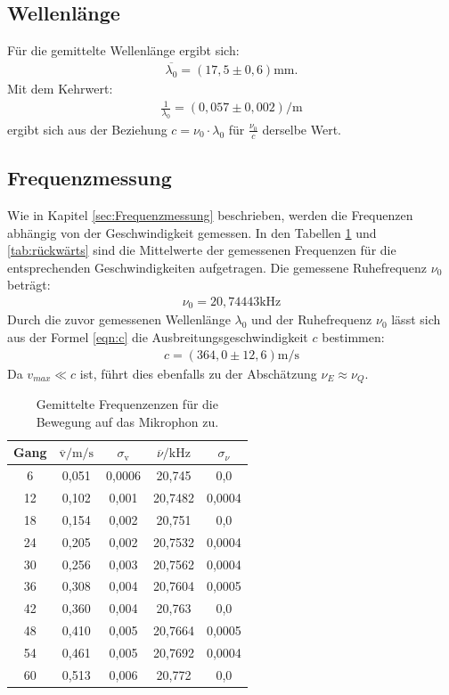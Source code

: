\subsection{Wellenlänge }
Für die gemittelte Wellenlänge ergibt sich:
\begin{align}
  \overline{\lambda_0}=(17,5\pm 0,6) \si{\milli\meter}.
\end{align}
Mit dem Kehrwert:
\begin{align}
\frac{1}{\lambda_0}=(0,057\pm 0,002) \si{\per\meter}
\end{align}
ergibt sich aus der Beziehung $c=\nu_0\cdot\lambda_0$ für $\frac{\nu_0}{c}$
derselbe Wert.

\subsection{Frequenzmessung}
Wie in Kapitel \ref{sec:Frequenzmessung} beschrieben, werden die
Frequenzen abhängig von der Geschwindigkeit gemessen.
In den Tabellen \ref{tab:vorwärts} und \ref{tab:rückwärts} sind
die Mittelwerte der gemessenen Frequenzen
für die entsprechenden Geschwindigkeiten aufgetragen.
Die gemessene Ruhefrequenz $\nu_0$ beträgt:
\begin{align}
  \nu_0=20,74443\text{kHz}
\end{align}
Durch die zuvor gemessenen Wellenlänge $\lambda_0$
und der Ruhefrequenz $\nu_0$ lässt sich aus der Formel \eqref{eqn:c}
die Ausbreitungsgeschwindigkeit $c$ bestimmen:
\begin{align}
  c=(364,0\pm12,6)\si{\meter\per\second}
\end{align}
Da $v_{max}\ll c$ ist, führt dies ebenfalls zu der Abschätzung
$\nu_E \approx \nu_Q $.
\begin{table}
  \centering
  \caption{Gemittelte Frequenzenzen für die Bewegung auf das Mikrophon zu.}
  \label{tab:vorwärts}
  \begin{tabular}{c c c c c}
    \toprule
Gang &  $ \overline{\text{v}} / \si{\meter\per\second}$ & $\sigma_{\text{v}}$
 & $\overline{\nu}/\si{\kilo\hertz}$ & $\sigma_{\nu}$\\
    \midrule
    6  & 0,051  & 0,0006 & 20,745  & 0,0\\
    12 & 0,102  & 0,001  & 20,7482 & 0,0004\\
    18 & 0,154  & 0,002  & 20,751  & 0,0\\
    24 & 0,205  & 0,002  & 20,7532 & 0,0004\\
    30 & 0,256  & 0,003  & 20,7562 & 0,0004\\
    36 & 0,308  & 0,004  & 20,7604 & 0,0005\\
    42 & 0,360  & 0,004  & 20,763  & 0,0\\
    48 & 0,410  & 0,005  & 20,7664 & 0,0005\\
    54 & 0,461  & 0,005  & 20,7692 & 0,0004\\
    60 & 0,513  & 0,006  & 20,772  & 0,0\\
    \bottomrule
  \end{tabular}
\end{table}
